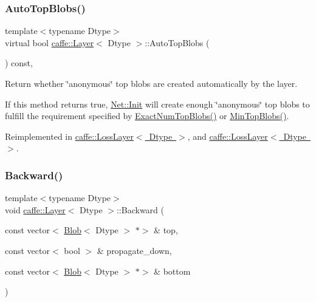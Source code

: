 \subsubsection{\texorpdfstring{Auto\+Top\+Blobs()}{AutoTopBlobs()}\hspace{0.1cm}{\footnotesize\ttfamily [2/2]}}
{\footnotesize\ttfamily template$<$typename Dtype$>$ \\
virtual bool \mbox{\hyperlink{classcaffe_1_1_layer}{caffe\+::\+Layer}}$<$ Dtype $>$\+::Auto\+Top\+Blobs (\begin{DoxyParamCaption}{ }\end{DoxyParamCaption}) const\hspace{0.3cm}{\ttfamily [inline]}, {\ttfamily [virtual]}}



Return whether \char`\"{}anonymous\char`\"{} top blobs are created automatically by the layer. 

If this method returns true, \mbox{\hyperlink{classcaffe_1_1_net_ae9fcfaabc89165d6c0cb4b14b4c6b584}{Net\+::\+Init}} will create enough \char`\"{}anonymous\char`\"{} top blobs to fulfill the requirement specified by \mbox{\hyperlink{classcaffe_1_1_layer_a64e2ca72c719e4b2f1f9216ccfb0d37f}{Exact\+Num\+Top\+Blobs()}} or \mbox{\hyperlink{classcaffe_1_1_layer_ab9e4c8d642e413948b131d851a8462a4}{Min\+Top\+Blobs()}}. 

Reimplemented in \mbox{\hyperlink{classcaffe_1_1_loss_layer_ae98a9942cdb1c67e09d45cc2d876618e}{caffe\+::\+Loss\+Layer$<$ Dtype $>$}}, and \mbox{\hyperlink{classcaffe_1_1_loss_layer_ae98a9942cdb1c67e09d45cc2d876618e}{caffe\+::\+Loss\+Layer$<$ Dtype $>$}}.

\mbox{\label{classcaffe_1_1_layer_a183d343f5183a4762307f2c5e6ed1e12}} 
\subsubsection{\texorpdfstring{Backward()}{Backward()}\hspace{0.1cm}{\footnotesize\ttfamily [1/2]}}
{\footnotesize\ttfamily template$<$typename Dtype$>$ \\
void \mbox{\hyperlink{classcaffe_1_1_layer}{caffe\+::\+Layer}}$<$ Dtype $>$\+::Backward (\begin{DoxyParamCaption}\item[{const vector$<$ \mbox{\hyperlink{classcaffe_1_1_blob}{Blob}}$<$ Dtype $>$ $\ast$$>$ \&}]{top,  }\item[{const vector$<$ bool $>$ \&}]{propagate\+\_\+down,  }\item[{const vector$<$ \mbox{\hyperlink{classcaffe_1_1_blob}{Blob}}$<$ Dtype $>$ $\ast$$>$ \&}]{bottom }\end{DoxyParamCaption})\hspace{0.3cm}{\ttfamily [inline]}}



